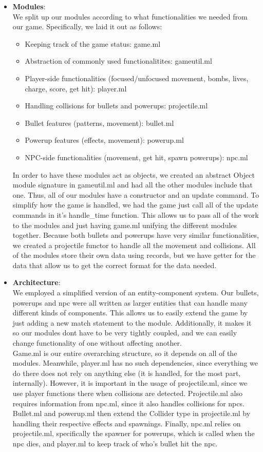 \documentclass{article}[12pt]
\begin{document}
\begin{itemize}
	\item \large{\textbf{Modules}}: \\
		We split up our modules according to what functionalities we needed from our game. Specifically, we laid it out as follows:
		\begin{itemize}
			\item Keeping track of the game status: game.ml
			\item Abstraction of commonly used functionalitites: gameutil.ml
			\item Player-side functionalities (focused/unfocused movement, bombs, lives, charge, score, get hit): player.ml
			\item Handling collisions for bullets and powerups: projectile.ml
			\item Bullet features (patterns, movement): bullet.ml
			\item Powerup features (effects, movement): powerup.ml
			\item NPC-side functionalities (movement, get hit, spawn powerups): npc.ml
		\end{itemize}
		In order to have these modules act as objects, we created an abstract Object module signature in gameutil.ml and had all the other modules include that one. Thus, all of our modules have a constructor and an update command. To simplify how the game is handled, we had the game just call all of the update commands in it's handle\_time function. This allows us to pass all of the work to the modules and just having game.ml unifying the different modules together. Because both bullets and powerups have very similar functionalities, we created a projectile functor to handle all the movement and collisions. All of the modules store their own data using records, but we have getter for the data that allow us to get the correct format for the data needed. 
	\item \large{\textbf{Architecture}}: \\ 
		We employed a simplified version of an entity-component system. Our bullets, powerups and npc were all written as larger entities that can handle many different kinds of components. This allows us to easily extend the game by just adding a new match statement to the module. Additionally, it makes it so our modules dont have to be very tightly coupled, and we can easily change functionality of one without affecting another.\\
		Game.ml is our entire overarching structure, so it depends on all of the modules. Meanwhile, player.ml has no such dependencies, since everything we do there does not rely on anything else (it is handled, for the most part, internally). However, it is important in the usage of projectile.ml, since we use player functions there when collisions are detected. Projectile.ml also requires information from npc.ml, since it also handles collisions for npcs. Bullet.ml and powerup.ml then extend the Collider type in projectile.ml by handling their respective effects and spawnings. Finally, npc.ml relies on projectile.ml, specifically the spawner for powerups, which is called when the npc dies, and player.ml to keep track of who's bullet hit the npc.

\end{itemize}
\end{document}
